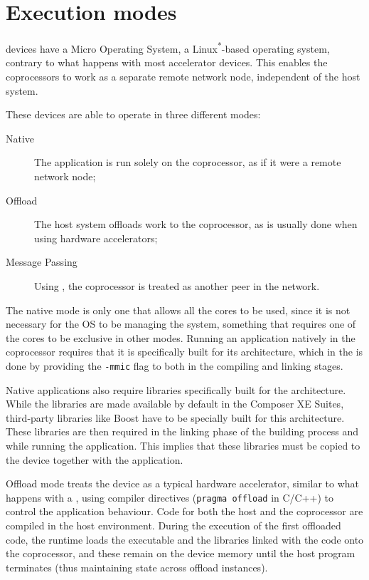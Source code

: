 \documentclass[../thesis]{subfiles}
\begin{document}
	\section{Execution modes}
	\label{sec:mic:modes}

	\intel\mic devices have a Micro Operating System, a Linux\textsuperscript{*}-based operating system, contrary to what happens with most accelerator devices. This enables the coprocessors to work as a separate remote network node, independent of the host system.

	These devices are able to operate in three different modes:
		\begin{description}
			\item [Native] The application is run solely on the coprocessor, as if it were a remote network node;
			\item [Offload] The host system offloads work to the coprocessor, as is usually done when using hardware accelerators;
			\item [Message Passing] Using \mpi, the coprocessor is treated as another peer in the network.
		\end{description}

	The native mode is only one that allows all the cores to be used, since it is not necessary for the OS to be managing the system, something that requires one of the cores to be exclusive in other modes. Running an application natively in the coprocessor requires that it is specifically built for its architecture, which in the \icc is done by providing the \texttt{-mmic} flag to both in the compiling and linking stages.

	Native applications also require libraries specifically built for the \intel\mic architecture. While the \intel libraries are made available by default in the \intel Composer XE Suites, third-party libraries like Boost have to be specially built for this architecture. These libraries are then required in the linking phase of the building process and while running the application. This implies that these libraries must be copied to the device together with the application. 


	Offload mode treats the device as a typical hardware accelerator, similar to what happens with a \gpu, using compiler directives (\texttt{pragma offload} in C/C++) to control the application behaviour. Code for both the host and the coprocessor are compiled in the host environment. During the execution of the first offloaded code, the runtime loads the executable and the libraries linked with the code onto the coprocessor, and these remain on the device memory until the host program terminates (thus maintaining state across offload instances).
\end{document}

